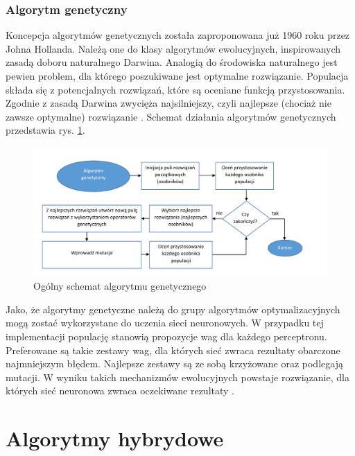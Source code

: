 \documentclass[twoside]{iisthesis}
\begin{document}
	 \subsubsection{Algorytm genetyczny}	
	 		 \label{ss:algorytm_genetyczny}
	 		 
	 		 Koncepcja algorytmów genetycznych została zaproponowana już 1960 roku przez Johna Hollanda. Należą one do klasy algorytmów ewolucyjnych, inspirowanych zasadą doboru naturalnego Darwina. Analogią do środowiska naturalnego jest pewien problem, dla którego poszukiwane jest optymalne rozwiązanie. Populacja składa się z potencjalnych rozwiązań, które są oceniane funkcją przystosowania. Zgodnie z zasadą Darwina zwycięża najsilniejszy, czyli najlepsze (chociaż nie zawsze optymalne) rozwiązanie \cite{pena2000evolutionary}. Schemat działania algorytmów genetycznych przedstawia rys. \ref{fig:algorytmgenetyczny}.	 
	 		 
	 		 
	 		 \begin{figure}[!ht] 
	 		 	\centering
	 		 	\includegraphics[width=1\textwidth]{algorytmgenetyczny}
	 		 	\caption{Ogólny schemat algorytmu genetycznego}
	 		 	\label{fig:algorytmgenetyczny}
	 		 \end{figure}
	 		 
	 		 Jako, że algorytmy genetyczne należą do grupy algorytmów optymalizacyjnych mogą zostać wykorzystane do uczenia sieci neuronowych. W przypadku tej implementacji populację stanowią propozycje wag dla każdego perceptronu. Preferowane są takie zestawy wag, dla których sieć zwraca rezultaty obarczone najmniejszym błędem. Najlepsze zestawy są ze sobą krzyżowane oraz podlegają mutacji. W wyniku takich mechanizmów ewolucyjnych powstaje rozwiązanie, dla których sieć neuronowa zwraca oczekiwane rezultaty \cite{aforgenetgenetic,montana1989training}.
	 		 
	 
	 \section{Algorytmy hybrydowe}
	 \label{s:algorytmyhybrydowe}
\end{document}
